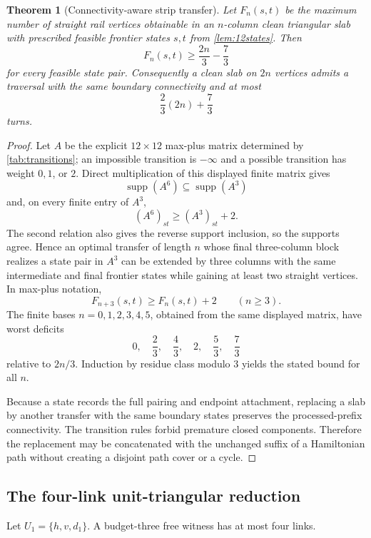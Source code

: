 \documentclass[11pt]{article}
\newtheorem{theorem}{Theorem}[section]
\theoremstyle{definition}
\newcommand{\supp}{\operatorname{supp}}
\begin{document}
\begin{theorem}[Connectivity-aware strip transfer]\label{thm:connectivity-strip}
Let $F_n(s,t)$ be the maximum number of straight rail vertices obtainable in an $n$-column clean triangular slab with prescribed feasible frontier states $s,t$ from \cref{lem:12states}.  Then
\[
\boxed{F_n(s,t)\ge\frac{2n}{3}-\frac73}
\]
for every feasible state pair.  Consequently a clean slab on $2n$ vertices admits a traversal with the same boundary connectivity and at most
\[
\boxed{\frac23(2n)+\frac73}
\]
turns.
\end{theorem}
\begin{proof}
Let $A$ be the explicit $12\times12$ max-plus matrix determined by \cref{tab:transitions}; an impossible transition is $-\infty$ and a possible transition has weight $0,1$, or $2$.  Direct multiplication of this displayed finite matrix gives
\[
\boxed{\supp(A^6)\subseteq\supp(A^3)}
\]
and, on every finite entry of $A^3$,
\[
\boxed{(A^6)_{st}\ge(A^3)_{st}+2.}
\]
The second relation also gives the reverse support inclusion, so the supports agree.  Hence an optimal transfer of length $n$ whose final three-column block realizes a state pair in $A^3$ can be extended by three columns with the same intermediate and final frontier states while gaining at least two straight vertices.  In max-plus notation,
\[
F_{n+3}(s,t)\ge F_n(s,t)+2\qquad(n\ge3).
\]
The finite bases $n=0,1,2,3,4,5$, obtained from the same displayed matrix, have worst deficits
\[
0,\quad\frac23,\quad\frac43,\quad2,\quad\frac53,\quad\frac73
\]
relative to $2n/3$.  Induction by residue class modulo $3$ yields the stated bound for all $n$.

Because a state records the full pairing and endpoint attachment, replacing a slab by another transfer with the same boundary states preserves the processed-prefix connectivity.  The transition rules forbid premature closed components.  Therefore the replacement may be concatenated with the unchanged suffix of a Hamiltonian path without creating a disjoint path cover or a cycle.
\end{proof}

\subsection{The four-link unit-triangular reduction}
Let $U_1=\{h,v,d_1\}$.  A budget-three free witness has at most four links.
\end{document}
